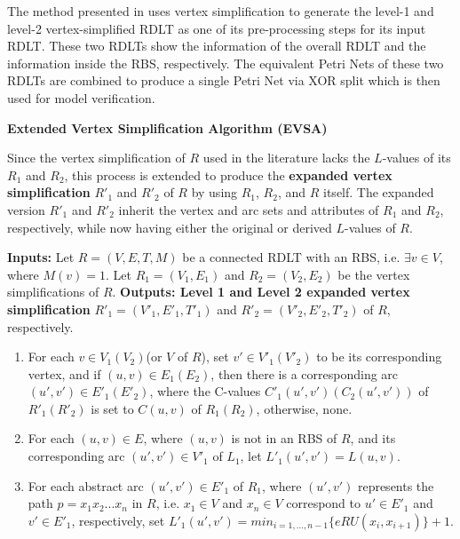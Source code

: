 \documentclass[12pt]{article}
\begin{document}
        The method presented in  \cite{sulla-malinao} uses vertex simplification to generate the level-1 and level-2 vertex-simplified RDLT as one of its pre-processing steps for its input RDLT. These two RDLTs show the information of the overall RDLT and the information inside the RBS, respectively. The equivalent Petri Nets of these two RDLTs are combined to produce a single Petri Net via XOR split which is then used for model verification.

        \begin{definition} \textbf{Extended Vertex Simplification Algorithm (EVSA)} \cite{malinao-wctp}

            Since the vertex simplification of $R$ used in the literature lacks the $L$-values of its $R_{1}$ and $R_{2}$, this process is extended to produce the \textbf{expanded vertex simplification} $R'_{1}$ and $R'_{2}$ of $R$ by using $R_{1}$, $R_{2}$, and $R$ itself. The expanded version $R'_{1}$ and $R'_{2}$ inherit the vertex and arc sets and attributes of $R_{1}$ and $R_{2}$, respectively, while now having either the original or derived $L$-values of $R$.

            \textbf{Inputs:} Let $R=(V,E,T,M)$ be a connected RDLT with an RBS, i.e. $\exists v \in V$, where $M(v)=1$. Let $R_{1}=(V_{1},E_{1})$ and $R_{2}=(V_{2},E_{2})$ be the vertex simplifications of $R$.
            \textbf{Outputs: Level 1 and Level 2 expanded vertex simplification} $R'_{1}=(V'_{1},E'_{1},T'_{1})$ and $R'_{2}=(V'_{2},E'_{2},T'_{2})$ of $R$, respectively.

            \begin{enumerate}
                \item For each $v \in V_{1}(V_{2})$(or $V$ of $R$), set $v' \in V'_{1}(V'_{2})$ to be its corresponding vertex, and if $(u,v) \in E_{1}(E_{2})$, then there is a corresponding arc $(u',v') \in E'_{1}(E'_{2})$, where the C-values $C'_{1}(u',v')(C_{2}(u',v'))$ of $R'_{1}(R'_2)$ is set to $C(u,v)$ of $R_{1}(R_{2})$, otherwise, none.

                \item For each $(u,v) \in E$, where $(u,v)$ is not in an RBS of $R$, and its corresponding arc $(u',v') \in V'_{1}$ of $L_{1}$, let $L'_{1}(u',v')=L(u,v)$.

                \item For each abstract arc $(u',v') \in E'_{1}$ of $R_{1}$, where $(u',v')$ represents the path $p=x_{1}x_{2}...x_{n}$ in $R$, i.e. $x_{1} \in V$ and $x_{n} \in V$ correspond to $u' \in E'_{1}$ and $v' \in E'_{1}$, respectively, set $L'_{1}(u',v')=min_{i=1,...,n-1} \{eRU(x_{i},x_{i+1})\}+1$.
                
            \end{enumerate}
        
        \end{definition}
\end{document}
